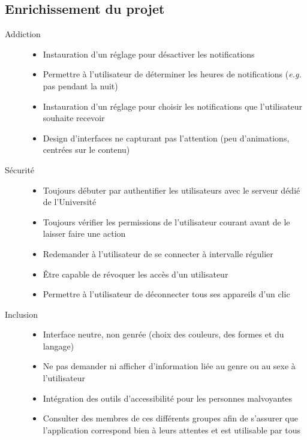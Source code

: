 \subsection{Enrichissement du projet}
\begin{description}
	\item[Addiction] \hfill
		\begin{itemize}
			\item Instauration d'un réglage pour désactiver les notifications
			\item Permettre à l'utilisateur de déterminer les heures de notifications (\textit{e.g.} pas pendant la nuit)
			\item Instauration d'un réglage pour choisir les notifications que l'utilisateur souhaite recevoir
			\item Design d'interfaces ne capturant pas l'attention (peu d'animations, centrées sur le contenu)
		\end{itemize}
		
	\item[Sécurité] \hfill
		\begin{itemize}
			\item Toujours débuter par authentifier les utilisateurs avec le serveur dédié de l'Université
			\item Toujours vérifier les permissions de l'utilisateur courant avant de le laisser faire une action
			\item Redemander à l'utilisateur de se connecter à intervalle régulier 
			\item Être capable de révoquer les accès d'un utilisateur
			\item Permettre à l'utilisateur de déconnecter tous ses appareils d'un clic
		\end{itemize}
		
	\item[Inclusion] \hfill
		\begin{itemize}
			\item Interface neutre, non genrée (choix des couleurs, des formes et du langage)
			\item Ne pas demander ni afficher d'information liée au genre ou au sexe à l'utilisateur
			\item Intégration des outils d'accessibilité pour les personnes malvoyantes
			\item Consulter des membres de ces différents groupes afin de s'assurer que l'application correspond bien à leurs attentes et est utilisable par tous
		\end{itemize}
\end{description}

